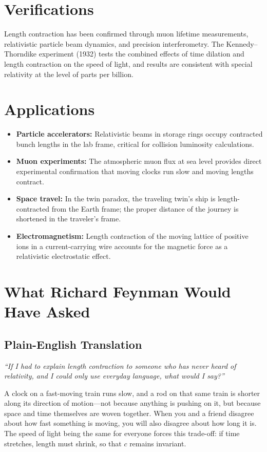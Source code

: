 \section*{Verifications}

Length contraction has been confirmed through muon lifetime measurements, relativistic particle beam dynamics, and precision interferometry. The Kennedy--Thorndike experiment (1932) tests the combined effects of time dilation and length contraction on the speed of light, and results are consistent with special relativity at the level of parts per billion.
\section*{Applications}

\begin{itemize}
  \item \textbf{Particle accelerators:} Relativistic beams in storage rings occupy contracted bunch lengths in the lab frame, critical for collision luminosity calculations.
  \item \textbf{Muon experiments:} The atmospheric muon flux at sea level provides direct experimental confirmation that moving clocks run slow and moving lengths contract.
  \item \textbf{Space travel:} In the twin paradox, the traveling twin's ship is length-contracted from the Earth frame; the proper distance of the journey is shortened in the traveler's frame.
  \item \textbf{Electromagnetism:} Length contraction of the moving lattice of positive ions in a current-carrying wire accounts for the magnetic force as a relativistic electrostatic effect.
\end{itemize}
\section*{What Richard Feynman Would Have Asked}

\subsection*{Plain-English Translation}
\textit{``If I had to explain length contraction to someone who has never heard of relativity, and I could only use everyday language, what would I say?''}

A clock on a fast-moving train runs slow, and a rod on that same train is shorter along its direction of motion---not because anything is pushing on it, but because space and time themselves are woven together. When you and a friend disagree about how fast something is moving, you will also disagree about how long it is. The speed of light being the same for everyone forces this trade-off: if time stretches, length must shrink, so that $c$ remains invariant.

